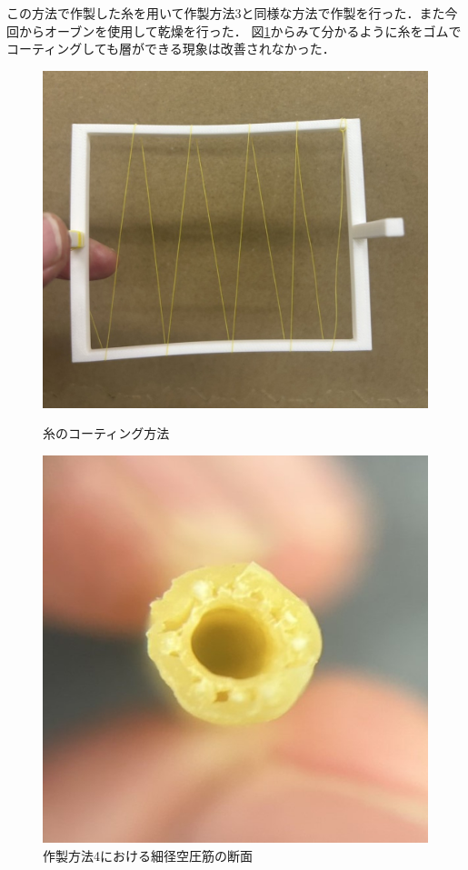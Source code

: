 この方法で作製した糸を用いて作製方法3と同様な方法で作製を行った．また今回からオーブンを使用して乾燥を行った．
図\ref{fig:27}からみて分かるように糸をゴムでコーティングしても層ができる現象は改善されなかった．
\begin{figure}[t]
  \centering
  \begin{minipage}[b]{0.49\hsize}
      \centering
      \includegraphics[scale=0.2]{pic/25.jpg}
  \caption{糸のコーティング方法}
  \label{fig:26}
  \end{minipage} \hfill
  \begin{minipage}[b]{0.49\hsize}
      \centering
      \includegraphics[scale=0.4]{pic/26.jpg}
  \caption{作製方法4における細径空圧筋の断面}
  \label{fig:27}
  \end{minipage} 
\end{figure}

